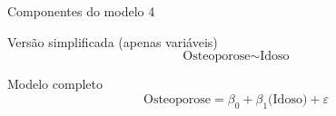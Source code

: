 \documentclass{beamer}
\begin{document}
\begin{frame}{\scriptsize Componentes do modelo 4}
  \begin{block}{\footnotesize Versão simplificada (apenas variáveis)}
    \footnotesize
    \begin{displaymath}
      \text{Osteoporose} \sim \text{Idoso}
    \end{displaymath}
  \end{block}
  \bigskip
  \bigskip
  \begin{block}{Modelo completo}
    \footnotesize
    \begin{displaymath}
      \text{Osteoporose} =\beta_0 + \beta_1 \text{(Idoso)} +\varepsilon
    \end{displaymath}
  \end{block}
  \vfill
\end{frame}
\end{document}
